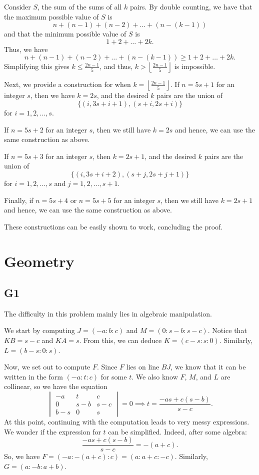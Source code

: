 \documentclass{scrartcl}
\begin{document}
Consider $S$, the sum of the sums of all $k$ pairs.
By double counting, we have that the maximum possible value of $S$ is
\[ n + (n-1) + (n-2) + \dots + (n-(k-1)) \]
and that the minimum possible value of $S$ is
\[ 1 + 2 + \dots + 2k. \]
Thus, we have
\[ n + (n-1) + (n-2) + \dots + (n-(k-1)) \geq 1 + 2 + \dots + 2k. \]
Simplifying this gives $k \leq \frac{2n-1}{5}$, and thus, $k > \left\lfloor \frac{2n-1}{5} \right\rfloor$ is impossible.

Next, we provide a construction for when $k = \left\lfloor \frac{2n-1}{5} \right\rfloor$.
If $n = 5s + 1$ for an integer $s$, then we have $k=2s$, and the desired $k$ pairs are the union of
\[ \{(i, 3s+i+1), (s+i, 2s+i)\} \]
for $i = 1,2,\dots,s$.

If $n = 5s + 2$ for an integer $s$, then we still have $k=2s$ and hence, we can use the same construction as above.

If $n = 5s + 3$ for an integer $s$, then $k = 2s+1$, and the desired $k$ pairs are the union of
\[ \{(i, 3s+i+2), (s+j, 2s+j+1)\} \]
for $i = 1,2,\dots,s$ and $j = 1,2,\dots,s+1$.

Finally, if $n = 5s+4$ or $n = 5s+5$ for an integer $s$, then we still have $k = 2s+1$ and hence, we can use the same construction as above.

These constructions can be easily shown to work, concluding the proof.

\section*{Geometry}
\subsection*{G1}
The difficulty in this problem mainly lies in algebraic manipulation.

We start by computing $J = (-a : b : c)$ and $M = (0 : s-b : s-c)$.
Notice that $KB = s-c$ and $KA = s$. From this, we can deduce $K = (c-s : s : 0)$.
Similarly, $L = (b-s : 0 : s)$.

Now, we set out to compute $F$. Since $F$ lies on line $BJ$, we know that it can be written in the form $(-a : t : c)$ for some $t$. We also know $F$, $M$, and $L$ are collinear, so we have the equation
\[
\begin{vmatrix}
    -a & t & c \\
    0 & s-b & s-c \\
    b-s & 0 & s
\end{vmatrix}
= 0 \implies t = \frac{-as + c(s-b)}{s-c}.
\]
At this point, continuing with the computation leads to very messy expressions.
We wonder if the expression for $t$ can be simplified. Indeed, after some algebra:
\[ \frac{-as + c(s-b)}{s-c} = -(a+c). \]
So, we have $F = (-a : -(a+c) : c) = (a : a + c : -c)$. Similarly, $G = (a : -b : a + b)$.
\end{document}
